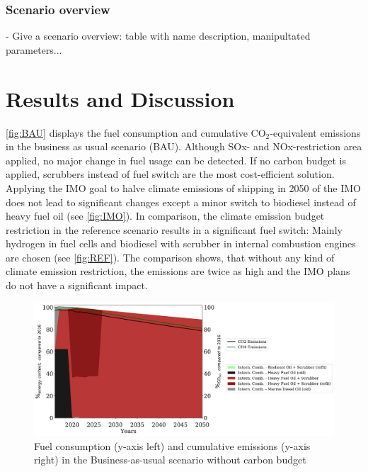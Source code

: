 \documentclass[article]{elsarticle}
\begin{document}
\subsubsection{Scenario overview}
- Give a scenario overview: table with name description, manipultated parameters...

\section{Results and Discussion}
\label{sec:Results}


\autoref{fig:BAU} displays the fuel consumption and cumulative CO$_2$-equivalent emissions in the business as usual scenario (BAU). Although SOx- and NOx-restriction area applied, no major change in fuel usage can be detected. If no carbon budget is applied, scrubbers instead of fuel switch are the most cost-efficient solution. Applying the IMO goal to halve climate emissions of shipping in 2050 of the IMO does not lead to significant changes except a minor switch to biodiesel instead of heavy fuel oil (see \autoref{fig:IMO}). In comparison, the climate emission budget restriction in the reference scenario  results in a significant fuel switch: Mainly hydrogen in fuel cells and biodiesel with scrubber in internal combustion engines are chosen (see \autoref{fig:REF}). The comparison shows, that without any kind of climate emission restriction, the emissions are twice as high and the IMO plans do not have a significant impact. 

\begin{figure}[htb]
    \centering
    \includegraphics[width=\textwidth]{figures/BAU_fuels_emissions.pdf}
    \caption{Fuel consumption (y-axis left) and cumulative emissions (y-axis right) in the Business-as-usual scenario without carbon budget}
    \label{fig:BAU}
\end{figure}
\end{document}

